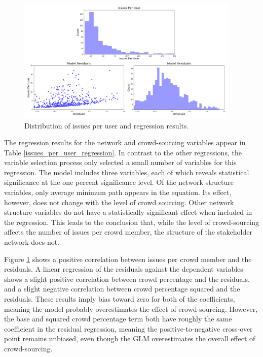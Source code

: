 \begin{figure}
  \includegraphics[width=0.95\textwidth]{issues_per_user_results.PNG}
\caption{Distribution of issues per user and regression results.}
\label{issues_per_user_results}
\end{figure}

The regression results for the network and crowd-sourcing variables appear in Table \ref{issues_per_user_regression}. In contrast to the other regressions, the variable selection process only selected a small number of variables for this regression. The model includes three variables, each of which reveals statistical significance at the one percent significance level. Of the network structure variables, only average minimum path appears in the equation. Its effect, however, does not change with the level of crowd sourcing. Other network structure variables do not have a statistically significant effect when included in the regression.  This leads to the conclusion that, while the level of crowd-sourcing affects the number of issues per crowd member, the structure of the stakeholder network does not. 

Figure \ref{issues_per_user_results} shows a positive correlation between issues per crowd member and the residuals. A linear regression of the residuals against the dependent variables shows a slight positive correlation between crowd percentage and the residuals, and a slight negative correlation between crowd percentage squared and the residuals. These results imply bias toward zero for both of the coefficients, meaning the model probably overestimates the effect of crowd-sourcing. However, the base and squared crowd percentage term both have roughly the same coefficient in the residual regression, meaning the positive-to-negative cross-over point remains unbiased, even though the GLM overestimates the overall effect of crowd-sourcing.

